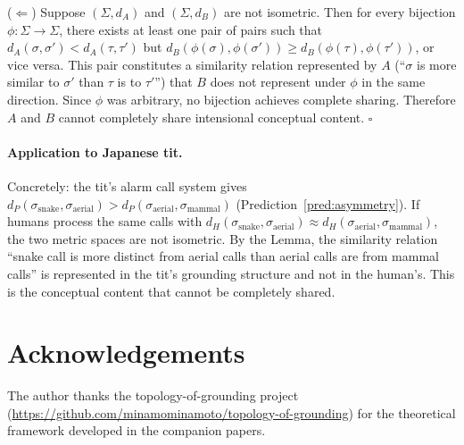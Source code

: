 \documentclass[12pt]{article}
\begin{document}
($\Leftarrow$) Suppose $(\Sigma, d_A)$ and $(\Sigma, d_B)$ are not isometric.
Then for every bijection $\phi: \Sigma \to \Sigma$,
there exists at least one pair of pairs such that
$d_A(\sigma, \sigma') < d_A(\tau, \tau')$ but
$d_B(\phi(\sigma), \phi(\sigma')) \geq d_B(\phi(\tau), \phi(\tau'))$,
or vice versa.
This pair constitutes a similarity relation represented by $A$
(``$\sigma$ is more similar to $\sigma'$ than $\tau$ is to $\tau'$'')
that $B$ does not represent under $\phi$ in the same direction.
Since $\phi$ was arbitrary, no bijection achieves complete sharing.
Therefore $A$ and $B$ cannot completely share intensional conceptual
content. $\square$

\paragraph{Application to Japanese tit.}
Concretely: the tit's alarm call system gives
$d_P(\sigma_\mathrm{snake}, \sigma_\mathrm{aerial}) >
d_P(\sigma_\mathrm{aerial}, \sigma_\mathrm{mammal})$
(Prediction~\ref{pred:asymmetry}).
If humans process the same calls with
$d_H(\sigma_\mathrm{snake}, \sigma_\mathrm{aerial}) \approx
d_H(\sigma_\mathrm{aerial}, \sigma_\mathrm{mammal})$,
the two metric spaces are not isometric.
By the Lemma, the similarity relation
``snake call is more distinct from aerial calls
than aerial calls are from mammal calls''
is represented in the tit's grounding structure and not in the human's.
This is the conceptual content that cannot be completely shared.

\section*{Acknowledgements}

The author thanks the topology-of-grounding project
(\url{https://github.com/minamominamoto/topology-of-grounding})
for the theoretical framework developed in the companion papers.
\end{document}
